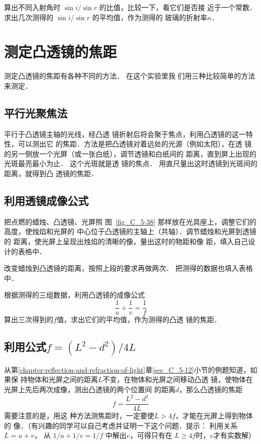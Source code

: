 算出不同入射角时
$\sin i/\sin r$
的比值，比较一下，看它们是否接
近于一个常数．求出几次测得的
$\sin i/\sin r$
的平均值，作为测得的
玻璃的折射率$n$．

\section{测定凸透镜的焦距}
测定凸透镜的焦距有各种不同的方法．
在这个实验里我
们用三种比较简单的方法来测定．

\subsection{平行光聚焦法}

平行于凸透镜主轴的光线，经凸透
镜折射后将会聚于焦点，利用凸透镜的这一特性，可以测出它
的焦距．方法是把凸透镜对着远处的光源（例如太阳），在透
镜的另一侧放一个光屏（或一张白纸），调节透镜和白纸间的
距离，直到屏上出现的光斑最亮最小为止．
这个光斑就是透
镜的焦点．
用直尺量出这时透镜到光斑间的距离，就得到凸
透镜的焦距．

\subsection{利用透镜成像公式}

把点燃的蜡烛、凸透镜、光屏照
图~\ref{fig_C_5-38} 那样放在光具座上，调整它们的高度，使烛焰和光屏的
中心位于凸透镜的主轴上（共轴）．调节蜡烛和光屏到透镜的
距离，使光屏上呈现出烛焰的清晰的像，量出这时的物距和像
距，填入自己设计的表格中．

改变蜡烛到凸透镜的距离，按照上段的要求再做两次．
把测得的数据也填入表格中．

根据测得的三组数据，利用凸透镜的成像公式
\[\frac{1}{u}+\frac{1}{v}=\frac{1}{f} \]
算出三次得到的$f$值，求出它们的平均值，作为测得的凸透
镜的焦距．

\subsection{利用公式$f=(L^2-d^2)/4L$}\label{subsec_C_app_01-8-3}

从第\ref{chapter-reflection-and-refraction-of-light}章\ref{sec_C_5-12}小节的例题知道，如果保
持物体和光屏之间的距离$L$不变，在物体和光屏之间移动凸透
镜，使物体在光屏上先后两次成像，测出凸透镜的两个位置间
的距离$d$，那么凸透镜的焦距
\[f=\dfrac{L^2-d^2}{4L} \]
需要注意的是，用这
种方法测焦距时，一定要使$L>4f$，才能在光屏上得到物体的
像．（有兴趣的同学可以自己考虑并证明一下这个问题．提示：
利用关系$L=u+v$，
从
$1/u+1/v=1/f $
中解出$v$，可得只有在
$L\ge 4f$时，$v$才有实数解）

